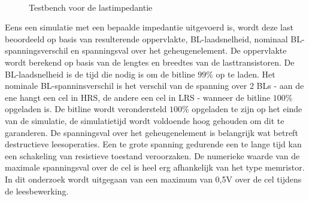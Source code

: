 \begin{figure}[!ht]
\centering
{}
\\
\caption[Testbench voor de lastimpedantie]{Testbench voor de lastimpedantie}\label{fig:simsetup}
\end{figure}

Eens een simulatie met een bepaalde impedantie uitgevoerd is, wordt deze last beoordeeld op basis van resulterende oppervlakte, BL-laadsnelheid, nominaal BL-spanningsverschil en spanningsval over het geheugenelement. De oppervlakte wordt berekend op basis van de lengtes en breedtes van de lasttransistoren. De BL-laadsnelheid is de tijd die nodig is om de bitline $99\%$ op te laden. Het nominale BL-spanninsverschil is het verschil van de spanning over 2 BLs - aan de ene hangt een cel in HRS, de andere een cel in LRS - wanneer de bitline $100\%$ opgeladen is. De bitline wordt verondersteld $100\%$ opgeladen te zijn op het einde van de simulatie, de simulatietijd wordt voldoende hoog gehouden om dit te garanderen. De spanningsval over het geheugenelement is belangrijk wat betreft destructieve leesoperaties. Een te grote spanning gedurende een te lange tijd kan een schakeling van resistieve toestand veroorzaken. De numerieke waarde van de maximale spanningsval over de cel is heel erg afhankelijk van het type memristor. In dit onderzoek wordt uitgegaan van een maximum van 0,5V over de cel tijdens de leesbewerking\cite{ppt:model}.

